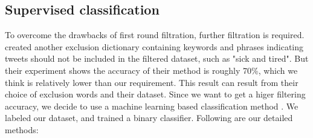 \subsection{Supervised classification}
\label{sec:Supervised classification}
To overcome the drawbacks of first round filtration, further filtration is required. \cite{elkin2017network} created another exclusion dictionary containing keywords and phrases indicating tweets should not be included in the filtered dataset, such as "sick and tired". But their experiment shows the accuracy of their method is roughly 70\%, which we think is relatively lower than our requirement. This result can result from their choice of exclusion words and their dataset.  Since we want to get a higer filtering accuracy, we decide to use a machine learning based classification method \cite{aramaki2011twitter}. We labeled our dataset, and trained a binary classifier. Following are our detailed methods:
